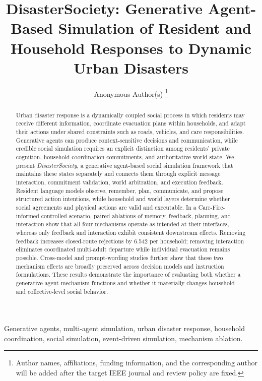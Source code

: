 \documentclass[journal]{IEEEtran}
\title{DisasterSociety: Generative Agent-Based Simulation of Resident and Household Responses to Dynamic Urban Disasters}
\author{Anonymous Author(s)%
\thanks{Author names, affiliations, funding information, and the corresponding
author will be added after the target IEEE journal and review policy are fixed.}}
\begin{document}
\maketitle


\begin{abstract}
Urban disaster response is a dynamically coupled social process in which
residents may receive different information, coordinate evacuation plans within
households, and adapt their actions under shared constraints such as roads,
vehicles, and care responsibilities. Generative agents can produce
context-sensitive decisions and communication, while credible social simulation
requires an explicit distinction among residents' private cognition, household
coordination commitments, and authoritative world state. We present
\emph{DisasterSociety}, a generative agent-based social simulation framework
that maintains these states separately and connects them through explicit
message interaction, commitment validation, world arbitration, and execution
feedback. Resident language models observe, remember, plan, communicate, and
propose structured action intentions, while household and world layers determine
whether social agreements and physical actions are valid and executable. In a
Carr-Fire-informed controlled scenario, paired ablations of memory, feedback,
planning, and interaction show that all four mechanisms operate as intended at
their interfaces, whereas only feedback and interaction exhibit consistent
downstream effects. Removing feedback increases closed-route rejections by
6.542 per household; removing interaction eliminates coordinated multi-adult
departure while individual evacuation remains possible. Cross-model and
prompt-wording studies further show that these two mechanism effects are
broadly preserved across decision models and instruction formulations. These
results demonstrate the importance of evaluating both whether a
generative-agent mechanism functions and whether it materially changes
household- and collective-level social behavior.
\end{abstract}

\begin{IEEEkeywords}
Generative agents, multi-agent simulation, urban disaster response, household
coordination, social simulation, event-driven simulation, mechanism ablation.
\end{IEEEkeywords}


\end{document}
